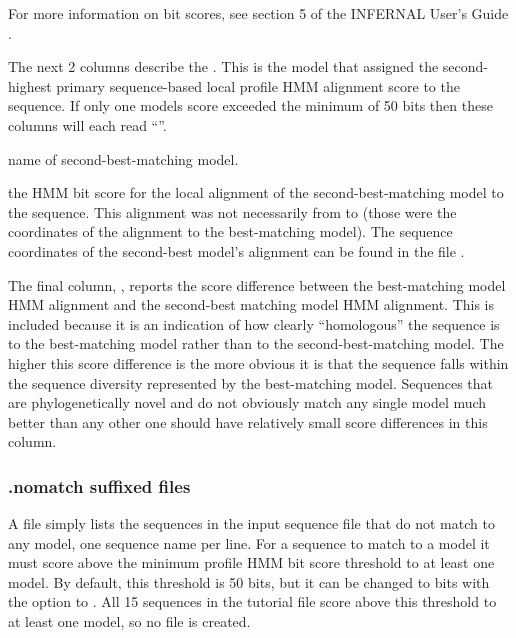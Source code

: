 For more information on bit scores, see section 5 of the INFERNAL
User's Guide \cite{Nawrocki09}. 

The next 2 columns describe the . This is the
model that assigned the second-highest primary sequence-based local 
profile HMM alignment score to the sequence. If only one models score
exceeded the minimum of 50 bits then these columns will each read
``\prog{-}''.

\begin{wideitem}
\item[\emprog{model name}] name of second-best-matching model.

\item[\emprog{HMM sc}] the HMM bit score for the local alignment of
  the second-best-matching model to the sequence. This alignment was
  not necessarily from  to  (those were the
  coordinates of the alignment to the best-matching model). The
  sequence coordinates of the second-best model's alignment can be
  found in the file .
\end{wideitem}

The final column, , reports the score difference between
the best-matching model HMM alignment and the second-best matching
model HMM alignment. This is included because it is an indication of
how clearly ``homologous'' the sequence is to the best-matching model
rather than to the second-best-matching model. The higher this score
difference is the more obvious it is that the sequence falls within
the sequence diversity represented by the best-matching model.
Sequences that are phylogenetically novel and do not obviously match
any single model much better than any other one should have relatively
small score differences in this column.

\subsubsection{.nomatch suffixed files}

A  file simply lists the sequences in the input
sequence file that do not match to any model, one sequence name per
line. For a sequence to match to a model it must score above the
minimum profile HMM bit score threshold to at least one model. By
default, this threshold is 50 bits, but it can be changed to
 bits with the  option to . All
15 sequences in the tutorial file  score above this
threshold to at least one model, so no  file is
created. 

